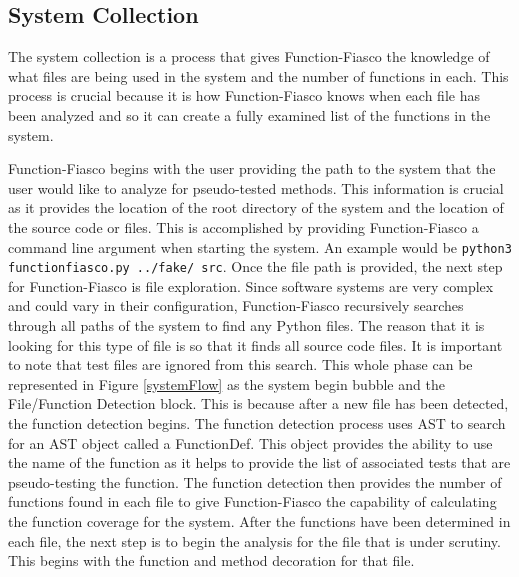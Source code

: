   \subsection{System Collection}
      The system collection is a process that gives Function-Fiasco the knowledge of what files are being used in the system and the number of functions in each. This process is crucial because it is how Function-Fiasco knows when each file has been analyzed and so it can create a fully examined list of the functions in the system.

          Function-Fiasco begins with the user providing the path to the system that the user would like to analyze for pseudo-tested methods. This information is crucial as it provides the location of the root directory of the system and the location of the source code or files. This is accomplished by providing Function-Fiasco a command line argument when starting the system. An example would be \texttt{python3 functionfiasco.py ../fake/ src}.
          Once the file path is provided, the next step for Function-Fiasco is file exploration. Since software systems are very complex and could vary in their configuration, Function-Fiasco recursively searches through all paths of the system to find any Python files. The reason that it is looking for this type of file is so that it finds all source code files. It is important to note that test files are ignored from this search. This whole phase can be represented in Figure \ref{systemFlow} as the system begin bubble and the File/Function Detection block. This is because after a new file has been detected, the function detection begins. The function detection process uses AST to search for an AST object called a FunctionDef. This object provides the ability to use the name of the function as it helps to provide the list of associated tests that are pseudo-testing the function. The function detection then provides the number of functions found in each file to give Function-Fiasco the capability of calculating the function coverage for the system. After the functions have been determined in each file, the next step is to begin the analysis for the file that is under scrutiny. This begins with the function and method decoration for that file.

